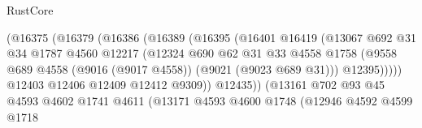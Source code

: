 \begin{lexlean}{RustCore}
\begin{coremodule}
                                      (@16375
                                        (@16379
                                          (@16386
                                            (@16389
                                              (@16395
                                                (@16401
                                                  @16419
                                                  (@13067
                                                    @692
                                                    @31
                                                    @34
                                                    @1787
                                                    @4560
                                                    @12217
                                                    (@12324
                                                      @690
                                                      @62
                                                      @31
                                                      @33
                                                      @4558
                                                      @1758
                                                      (@9558
                                                        @689
                                                        @4558
                                                        (@9016 (@9017 @4558))
                                                        (@9021 (@9023 @689 @31)))
                                                      @12395)))))
                                            @12403
                                            @12406
                                            @12409
                                            @12412
                                            @9309))
                                        @12435))
                                    (@13161
                                      @702
                                      @93
                                      @45
                                      @4593
                                      @4602
                                      @1741
                                      @4611
                                      (@13171
                                        @4593
                                        @4600
                                        @1748
                                        (@12946
                                          @4592
                                          @4599
                                          @1718

\end{coremodule}
\end{lexlean}
